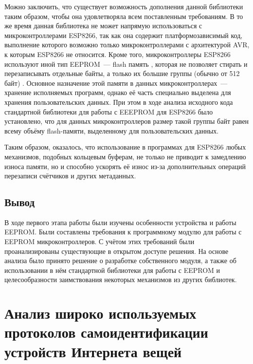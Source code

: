 Можно заключить, что существует возможность дополнения данной библиотеки таким образом, чтобы она удовлетворяла всем поставленным требованиям.
В то же время данная библиотека не может напрямую использоваться с микроконтроллерами ESP8266, так как она содержит платформозависимый код, выполнение которого возможно только микроконтроллерами с архитектурой AVR, к которым ESP8266 не относится.
Кроме того, микроконтроллеры ESP8266 используют иной тип EEPROM~--- flash память \cite{web:esp-eeprom-src, web:usage-of-esp-eeprom}, которая не позволяет стирать и перезаписывать отдельные байты, а только их большие группы (обычно от 512 байт) \cite{incollection:flash-memory}.
Основное назначение этой памяти в данных микроконтроллерах~--- хранение исполняемых программ, однако её часть специально выделена для хранения пользовательских данных.
При этом в ходе анализа исходного кода стандартной библиотеки \cite{web:esp-eeprom-src} для работы с EEEPROM для ESP8266 было установлено, что для данных микроконтроллеров размер такой группы байт равен всему объёму flash-памяти, выделенному для пользовательских данных.

Таким образом, оказалось, что использование в программах для ESP8266 любых механизмов, подобных кольцевым буферам, не только не приводит к замедлению износа памяти, но и способно ускорять её износ из-за дополнительных операций перезаписи счётчиков и других метаданных.

\subsection{Вывод}

В ходе первого этапа работы были изучены особенности устройства и работы EEPROM.
Были составлены требования к программному модулю для работы с EEPROM микроконтроллеров.
С учётом этих требований были проанализированы существующие в открытом доступе решения.
На основе анализа было принято решение о разработке собственного модуля, а также об использовании в нём стандартной библиотеки для работы с EEPROM и целесообразности заимствования некоторых механизмов из других библиотек.


\section{Анализ широко используемых протоколов самоидентификации устройств Интернета вещей}


